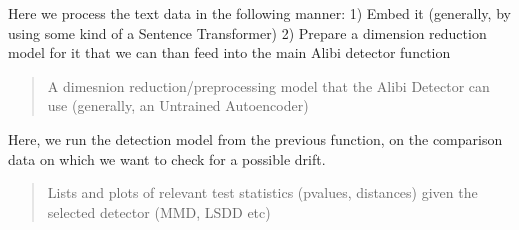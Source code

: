 \documentclass[letterpaper,10pt,english]{sphinxmanual}
\begin{document}
\begin{fulllineitems}
\begin{fulllineitems}
\end{fulllineitems}


\begin{fulllineitems}
\label{\detokenize{alibiModules/basicDetectors:basicDetectors.basicDetectors.preprocess}}
\pysigstartsignatures
{}
\pysigstopsignatures
\sphinxAtStartPar
Here we process the text data in the following manner:
1) Embed it (generally, by using some kind of a Sentence Transformer)
2) Prepare a dimension reduction model for it that we can than feed into the main Alibi
detector function
\begin{quote}\begin{description}
\sphinxAtStartPar
A dimesnion reduction/preprocessing model that the Alibi Detector can use (generally, an Untrained Autoencoder)

\end{description}\end{quote}

\end{fulllineitems}


\begin{fulllineitems}
\label{\detokenize{alibiModules/basicDetectors:basicDetectors.basicDetectors.run}}
\pysigstartsignatures
{}
\pysigstopsignatures
\sphinxAtStartPar
Here, we run the detection model from the previous function, on the comparison data on
which we want to check for a possible drift.
\begin{quote}\begin{description}
\sphinxAtStartPar
Lists and plots of relevant test statistics (p\sphinxhyphen{}values, distances) given the selected detector (MMD, LSDD etc)

\end{description}\end{quote}

\end{fulllineitems}



\end{fulllineitems}
\end{document}
